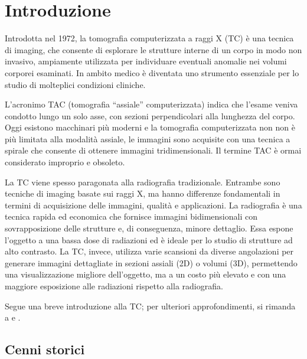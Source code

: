 \documentclass[12pt,a4paper]{report}
\begin{document}
\pagestyle{fancy}
\tableofcontents
\clearpage

\pagestyle{fancy}
\newpage
{}

\chapter{Introduzione} \label{chap:intro}

Introdotta nel 1972, la tomografia computerizzata a raggi X (TC) è una tecnica di imaging, che consente di esplorare le strutture
interne di un corpo in modo non invasivo, ampiamente utilizzata per individuare eventuali anomalie nei volumi corporei esaminati.
In ambito medico è diventata uno strumento essenziale per lo studio di molteplici condizioni cliniche.

L'acronimo TAC (tomografia ``assiale'' computerizzata) indica che l'esame veniva condotto lungo un solo asse, con sezioni
perpendicolari alla lunghezza del corpo.
Oggi esistono macchinari più moderni e la tomografia computerizzata non non è più limitata alla modalità assiale, le immagini sono
acquisite con una tecnica a spirale che consente di ottenere immagini tridimensionali.
Il termine TAC è ormai considerato improprio e obsoleto.

La TC viene spesso paragonata alla radiografia tradizionale.
Entrambe sono tecniche di imaging basate sui raggi X, ma hanno differenze fondamentali in termini di acquisizione delle immagini,
qualità e applicazioni.
La radiografia è una tecnica rapida ed economica che fornisce immagini bidimensionali con sovrapposizione delle strutture e, di
conseguenza, minore dettaglio.
Essa espone l'oggetto a una bassa dose di radiazioni ed è ideale per lo studio di strutture ad alto contrasto.
La TC, invece, utilizza varie scansioni da diverse angolazioni per generare immagini dettagliate in sezioni assiali (2D) o volumi
(3D), permettendo una visualizzazione migliore dell'oggetto, ma a un costo più elevato e con una maggiore esposizione alle
radiazioni rispetto alla radiografia.

Segue una breve introduzione alla TC; per ulteriori approfondimenti, si rimanda a \cite{Faggioni2011} e \cite{MoroLoli2021}.

\section{Cenni storici}
\end{document}
